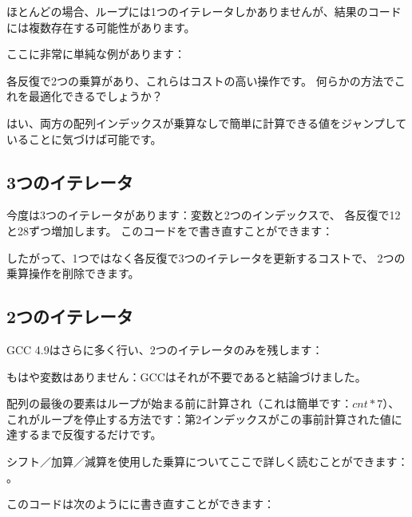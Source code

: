 \label{loop_iterators}

ほとんどの場合、ループには1つのイテレータしかありませんが、結果のコードには複数存在する可能性があります。

ここに非常に単純な例があります：



各反復で2つの乗算があり、これらはコストの高い操作です。
何らかの方法でこれを最適化できるでしょうか？

はい、両方の配列インデックスが乗算なしで簡単に計算できる値をジャンプしていることに気づけば可能です。

\subsection{3つのイテレータ}



今度は3つのイテレータがあります：変数と2つのインデックスで、
各反復で12と28ずつ増加します。
このコードを\CCpp で書き直すことができます：



したがって、1つではなく各反復で3つのイテレータを更新するコストで、
2つの乗算操作を削除できます。

\subsection{2つのイテレータ}

GCC 4.9はさらに多く行い、2つのイテレータのみを残します：



もはや変数はありません：GCCはそれが不要であると結論づけました。

配列の最後の要素はループが始まる前に計算され（これは簡単です：$cnt*7$）、
これがループを停止する方法です：第2インデックスがこの事前計算された値に達するまで反復するだけです。

シフト／加算／減算を使用した乗算についてここで詳しく読むことができます：
。

このコードは次のように\CCpp に書き直すことができます：



